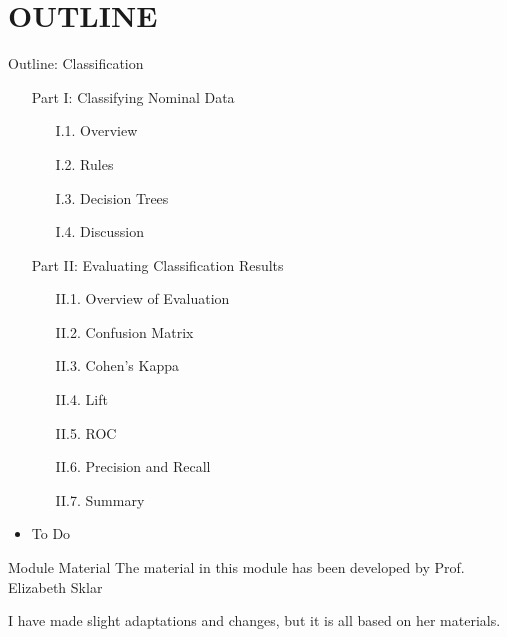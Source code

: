 \documentclass[handout]{beamer}
\begin{document}
\section*{OUTLINE}
\begin{frame}{Outline: Classification}
\begin{itemize}
\item[] Part I: Classifying Nominal Data
	\begin{itemize}
	\item[I.1.] Overview
    \item[I.2.] Rules
    \item[I.3.] Decision Trees
    \item[I.4.] Discussion
	\end{itemize}
\item[] Part II: Evaluating Classification Results
	\begin{itemize}
    \item[II.1.] Overview of Evaluation
    \item[II.2.] Confusion Matrix
    \item[II.3.] Cohen's Kappa
    \item[II.4.] Lift
    \item[II.5.] ROC
    \item[II.6.] Precision and Recall
    \item[II.7.] Summary
	\end{itemize}
\vspace*{0.3cm}
\item To Do
\end{itemize}
\end{frame}
\begin{frame}{Module Material}
\centering
\huge{The material in this module has been developed by Prof. Elizabeth Sklar}
\vspace{1cm}

\large I have made slight adaptations and changes, but it is all based on her materials.
\end{frame}


\end{document}
